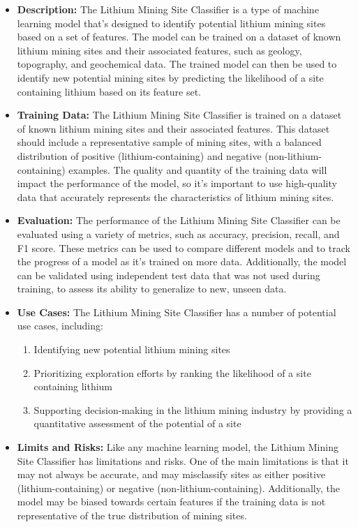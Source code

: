 \begin{itemize} 
    \item \textbf{Description:} The Lithium Mining Site Classifier is a type of machine learning model that's designed to identify potential lithium mining sites based on a set of features. The model can be trained on a dataset of known lithium mining sites and their associated features, such as geology, topography, and geochemical data. The trained model can then be used to identify new potential mining sites by predicting the likelihood of a site containing lithium based on its feature set.
    \item \textbf{Training Data:} The Lithium Mining Site Classifier is trained on a dataset of known lithium mining sites and their associated features. This dataset should include a representative sample of mining sites, with a balanced distribution of positive (lithium-containing) and negative (non-lithium-containing) examples. The quality and quantity of the training data will impact the performance of the model, so it's important to use high-quality data that accurately represents the characteristics of lithium mining sites.
    \item \textbf{Evaluation:} The performance of the Lithium Mining Site Classifier can be evaluated using a variety of metrics, such as accuracy, precision, recall, and F1 score. These metrics can be used to compare different models and to track the progress of a model as it's trained on more data. Additionally, the model can be validated using independent test data that was not used during training, to assess its ability to generalize to new, unseen data.
    \item \textbf{Use Cases:} The Lithium Mining Site Classifier has a number of potential use cases, including:
    \begin{enumerate}
        \item Identifying new potential lithium mining sites
        \item Prioritizing exploration efforts by ranking the likelihood of a site containing lithium
        \item Supporting decision-making in the lithium mining industry by providing a quantitative assessment of the potential of a site
    \end{enumerate}
\item \textbf{Limits and Risks:} Like any machine learning model, the Lithium Mining Site Classifier has limitations and risks. One of the main limitations is that it may not always be accurate, and may misclassify sites as either positive (lithium-containing) or negative (non-lithium-containing). Additionally, the model may be biased towards certain features if the training data is not representative of the true distribution of mining sites.

\end{itemize}
